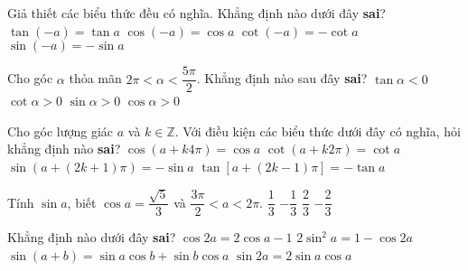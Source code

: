 \begin{ex}%
	Giả thiết các biểu thức đều có nghĩa. Khẳng định nào dưới đây \textbf{sai}?
	\choice
	{\True $\tan (-a)=\tan a$}
	{$\cos (-a)=\cos a$}
	{$\cot (-a)=-\cot a$}
	{$\sin (-a)=-\sin a$}
\end{ex}
\begin{ex}%
	Cho góc $\alpha$ thỏa mãn $2\pi <\alpha <\dfrac{5\pi}{2}$. Khẳng định nào sau đây \textbf{sai}?
	\choice
	{\True $\tan \alpha<0$}
	{$\cot \alpha>0$}
	{$\sin \alpha>0$}
	{$\cos \alpha>0$}
\end{ex}
\begin{ex}%
	Cho góc lượng giác $a$ và $k\in \mathbb{Z}$. Với điều kiện các biểu thức dưới đây có nghĩa, hỏi khẳng định nào \textbf{sai}?
	\choice
	{$\cos(a+k4\pi)=\cos a$}
	{$\cot(a+k2\pi)=\cot a$}
	{$\sin(a+(2k+1)\pi)=-\sin a$}
	{\True $\tan[a+(2k-1)\pi]=-\tan a$}
\end{ex}
\begin{ex}%
	Tính $\sin a$, biết $\cos a=\dfrac{\sqrt{5}}{3}$ và $\dfrac{3\pi}{2}<a<2\pi$.
	\choice
	{$\dfrac{1}{3}$}
	{$-\dfrac{1}{3}$}
	{$\dfrac{2}{3}$}
	{\True $-\dfrac{2}{3}$}
	\loigiai{
	Ta có $\sin ^2a+\cos ^2a=1\Rightarrow \sin ^2a=1-\left(\dfrac{\sqrt{5}}{3}\right)^2=\dfrac{4}{9}\Rightarrow \left[\begin{aligned}&\sin a=\dfrac{2}{3}\\&\sin a=-\dfrac{2}{3}\end{aligned}\right.$.\\ Do $\dfrac{3\pi}{2}<a<2\pi$ suy ra $\sin a<0\Rightarrow \sin a=-\dfrac{2}{3}$.
}
\end{ex}
\begin{ex}%
	Khẳng định nào dưới đây \textbf{sai}?
	\choice
	{\True $\cos 2a=2\cos a-1$}
	{$2\sin^2 a=1-\cos 2a$}
	{$\sin(a+b)=\sin a\cos b+\sin b\cos a$}
	{$\sin 2a=2\sin a\cos a$}
\end{ex}
